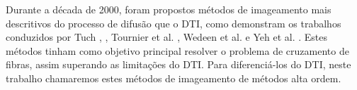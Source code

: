 \documentclass[
    12pt,                %
    oneside,            %
    a4paper,            %
    english,            %
    french,                %
    spanish,            %
    brazil                %
    ]{abntex2}
\begin{document}









%











Durante a década de 2000, foram propostos métodos de imageamento mais descritivos do processo de difusão que o DTI, como demonstram os trabalhos conduzidos por Tuch \cite{tuch2002}, \cite{TuchQBall2004}, Tournier et al. \cite{tournier2007}, Wedeen et al. \cite{wedeen2005} e Yeh et al. \cite{yeh2010}. Estes métodos tinham como objetivo principal resolver o problema de cruzamento de fibras, assim superando as limitações do DTI. Para diferenciá-los do DTI, neste trabalho chamaremos estes métodos de imageamento de \textsf{métodos alta ordem}.
\end{document}
